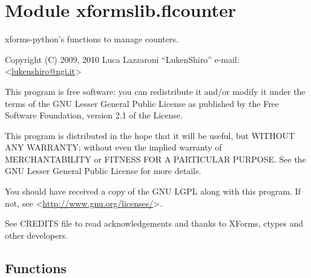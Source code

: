 %
%
%


\section{Module xformslib.flcounter}

    \label{xformslib:flcounter}

xforms-python's functions to manage counters.

Copyright (C) 2009, 2010  Luca Lazzaroni ``LukenShiro''
e-mail: <\href{mailto:lukenshiro@ngi.it}{lukenshiro@ngi.it}>

This program is free software: you can redistribute it and/or modify
it under the terms of the GNU Lesser General Public License as
published by the Free Software Foundation, version 2.1 of the License.

This program is distributed in the hope that it will be useful,
but WITHOUT ANY WARRANTY; without even the implied warranty of
MERCHANTABILITY or FITNESS FOR A PARTICULAR PURPOSE. See the
GNU Lesser General Public License for more details.

You should have received a copy of the GNU LGPL along with this
program. If not, see <\href{http://www.gnu.org/licenses/}{http://www.gnu.org/licenses/}>.

See CREDITS file to read acknowledgements and thanks to XForms,
ctypes and other developers.


  \subsection{Functions}

    \label{xformslib:flcounter:fl_add_counter}

